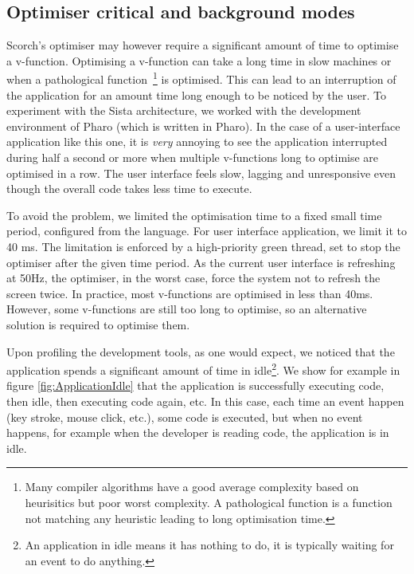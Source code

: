 \documentclass[a4paper,12pt,twoside]{../includes/ThesisStyle}
\begin{document}
\subsection{Optimiser critical and background modes}
\label{sec:optModes}

Scorch's optimiser may however require a significant amount of time to optimise a v-function. Optimising a v-function can take a long time in slow machines or when a pathological function~\footnote{Many compiler algorithms have a good average complexity based on heurisitics but poor worst complexity. A pathological function is a function not matching any heuristic leading to long optimisation time.} is optimised. This can lead to an interruption of the application for an amount time long enough to be noticed by the user. To experiment with the Sista architecture, we worked with the development environment of Pharo (which is written in Pharo). In the case of a user-interface application like this one, it is \emph{very} annoying to see the application interrupted during half a second or more when multiple v-functions long to optimise are optimised in a row. The user interface feels slow, lagging and unresponsive even though the overall code takes less time to execute.

To avoid the problem, we limited the optimisation time to a fixed small time period, configured from the language. For user interface application, we limit it to 40 ms. The limitation is enforced by a high-priority green thread, set to stop the optimiser after the given time period. As the current user interface is refreshing at 50Hz, the optimiser, in the worst case, force the system not to refresh the screen twice. In practice, most v-functions are optimised in less than 40ms. However, some v-functions are still too long to optimise, so an alternative solution is required to optimise them.

Upon profiling the development tools, as one would expect, we noticed that the application spends a significant amount of time in idle\footnote{An application in idle means it has nothing to do, it is typically waiting for an event to do anything.}. We show for example in figure \ref{fig:ApplicationIdle} that the application is successfully executing code, then idle, then executing code again, etc. In this case, each time an event happen (key stroke, mouse click, etc.), some code is executed, but when no event happens, for example when the developer is reading code, the application is in idle.
\end{document}
